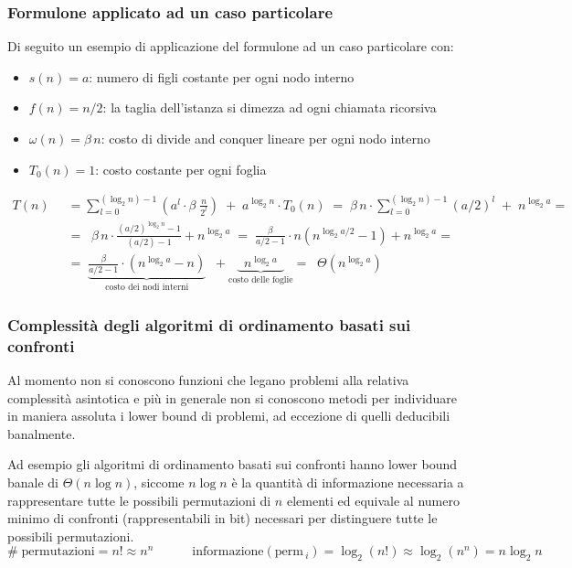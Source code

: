 \subsubsection*{Formulone applicato ad un caso particolare}
Di seguito un esempio di applicazione del formulone ad un caso particolare con:
\begin{itemize}
	\item \(s(n) = a\): numero di figli costante per ogni nodo interno
	\item \(f(n) = n/2\): la taglia dell'istanza si dimezza ad ogni chiamata ricorsiva
	\item \(\omega(n) = \beta \, n\): costo di divide and conquer lineare per ogni nodo interno
	\item \(T_0(n) = 1\): costo costante per ogni foglia
\end{itemize}
\begin{align*}
	T(n) \;\; &= \sum_{l=0}^{(\log_2 n) - 1} \left( a^l \cdot \beta \; \frac{n}{2^l} \right) \; + \; a^{\log_2 n} \cdot T_0(n) \; = \; \beta \, n \cdot \! \sum_{l=0}^{(\log_2 n) - 1} \!\! \left( a/2 \right)^l \; + \; n^{\log_2 a} = \\[3pt]
	&= \;\; \beta \, n \cdot \frac{(a/2)^{\log_2 n} - 1}{(a/2) - 1} + n^{\log_2 a} \; = \; \frac{\beta}{a/2 - 1} \cdot n \left( n^{\log_2 a/2} - 1\right) + n^{\log_2 a} = \\[3pt]
	&= \; \underbrace{\frac{\beta}{a/2 - 1} \cdot (n^{\log_2 a} - n)}_{\text{costo dei nodi interni}} \;\; + \!\! \underbrace{ \;\; n^{\log_2 a} \;\;}_{\text{costo delle foglie}}
	\!\! = \;\; \Theta \left( n^{\log_2 a} \right)
\end{align*}

\subsubsection*{Complessità degli algoritmi di ordinamento basati sui confronti}
Al momento non si conoscono funzioni che legano problemi alla relativa complessità asintotica e più in generale non si
conoscono metodi per individuare in maniera assoluta i lower bound di problemi, ad eccezione di quelli deducibili banalmente.

Ad esempio gli algoritmi di ordinamento basati sui confronti hanno lower bound banale di \(\Theta(n \log n)\), siccome
\(n \log n\) è la quantità di informazione necessaria a rappresentare tutte le possibili permutazioni di \(n\) elementi ed
equivale al numero minimo di confronti (rappresentabili in bit) necessari per distinguere tutte le possibili permutazioni.
\[\# \; \text{permutazioni} = n! \approx n^n \qquad\quad \text{informazione}(\text{perm} \,_i) = \log_2(n!) \approx \log_2(n^n) = n \log_2 n\]

